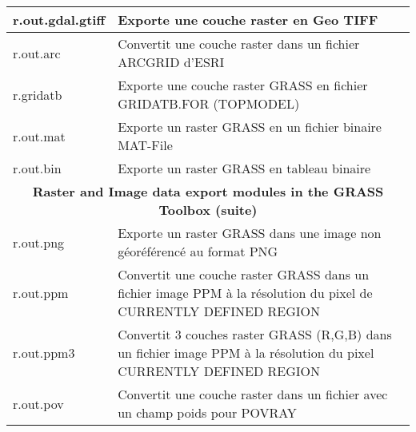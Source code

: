 \begin{table}[htb]
\centering
 \begin{tabular}{|p{2.5cm}|p{11.5cm}|}
  \hline r.out.gdal.gtiff & Exporte une couche raster en Geo TIFF \\
  \hline r.out.arc & Convertit une couche raster dans un fichier ARCGRID d'ESRI \\
  \hline r.gridatb & Exporte une couche raster GRASS en fichier GRIDATB.FOR (TOPMODEL) \\
  \hline r.out.mat & Exporte un raster GRASS en un fichier binaire MAT-File \\
  \hline r.out.bin & Exporte un raster GRASS en tableau binaire \\
  \hline \multicolumn{2}{|c|}{\textbf{Raster and Image data export modules in
the GRASS Toolbox (suite)}} \\ 
  \hline r.out.png & Exporte un raster GRASS dans une image non géoréférencé au format PNG \\
  \hline r.out.ppm & Convertit une couche raster GRASS dans un fichier image PPM à la résolution du pixel de CURRENTLY DEFINED REGION \\
  \hline r.out.ppm3 & Convertit 3 couches raster GRASS (R,G,B) dans un fichier image PPM à la résolution du pixel CURRENTLY DEFINED REGION \\
  \hline r.out.pov & Convertit une couche raster dans un fichier avec un champ poids pour POVRAY\\

\end{tabular}
\end{table}

